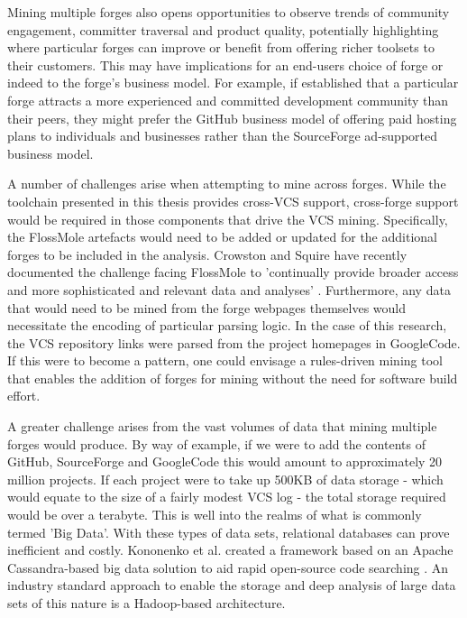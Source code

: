 Mining multiple forges also opens opportunities to observe trends of community engagement, committer traversal and product quality, potentially highlighting where particular forges can improve or benefit from offering richer toolsets to their customers. This may have implications for an end-users choice of forge or indeed to the forge's business model. For example, if established that a particular forge attracts a more experienced and committed development community than their peers, they might prefer the GitHub business model of offering paid hosting plans to individuals and businesses rather than the SourceForge ad-supported business model.

A number of challenges arise when attempting to mine across forges. While the toolchain presented in this thesis provides cross-VCS support, cross-forge support would be required in those components that drive the VCS mining. Specifically, the FlossMole artefacts would need to be added or updated for the additional forges to be included in the analysis. Crowston and Squire have recently documented the challenge facing FlossMole to 'continually provide broader access and more sophisticated and relevant data and analyses' \citep{crowston2017lessons}. Furthermore, any data that would need to be mined from the forge webpages themselves would necessitate the encoding of particular parsing logic. In the case of this research, the VCS repository links were parsed from the project homepages in GoogleCode. If this were to become a pattern, one could envisage a rules-driven mining tool that enables the addition of forges for mining without the need for software build effort.

A greater challenge arises from the vast volumes of data that mining multiple forges would produce. By way of example, if we were to add the contents of GitHub, SourceForge and GoogleCode this would amount to approximately 20 million projects. If each project were to take up 500KB of data storage - which would equate to the size of a fairly modest VCS log - the total storage required would be over a terabyte. This is well into the realms of what is commonly termed 'Big Data'. With these types of data sets, relational databases can prove inefficient and costly. Kononenko et al. created a framework based on an Apache Cassandra-based big data solution to aid rapid open-source code searching \citep{kononenko2014mining}. An industry standard approach to enable the storage and deep analysis of large data sets of this nature is a Hadoop-based architecture. 

